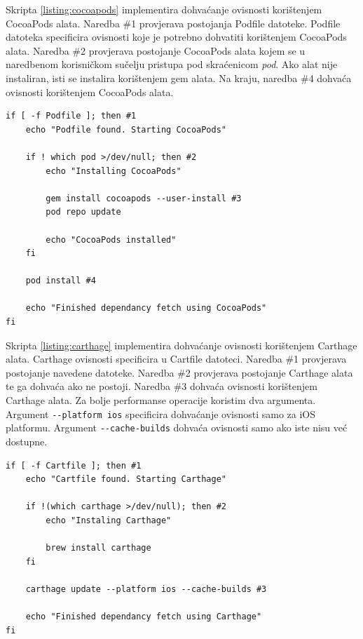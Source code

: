 \documentclass[times, utf8, diplomski, numeric]{fer}
\begin{document}
\begin{appendices}
Skripta \ref{listing:cocoapods} implementira dohvaćanje ovisnosti korištenjem CocoaPods alata. Naredba \#1 provjerava postojanja Podfile datoteke. Podfile datoteka specificira ovisnosti koje je potrebno dohvatiti korištenjem CocoaPods alata. Naredba \#2 provjerava postojanje CocoaPods alata kojem se u naredbenom korisničkom sučelju pristupa pod skraćenicom \textit{pod}. Ako alat nije instaliran, isti se instalira korištenjem gem alata. Na kraju, naredba \#4 dohvaća ovisnosti korištenjem CocoaPods alata.

\begin{lstlisting}[caption=Dohvat ovisnosti korištenjem alata CocoaPods, label=listing:cocoapods]
if [ -f Podfile ]; then #1
    echo "Podfile found. Starting CocoaPods"

    if ! which pod >/dev/null; then #2
        echo "Installing CocoaPods"

        gem install cocoapods --user-install #3
        pod repo update

        echo "CocoaPods installed"
    fi

    pod install #4

    echo "Finished dependancy fetch using CocoaPods"
fi
\end{lstlisting}

Skripta \ref{listing:carthage} implementira dohvaćanje ovisnosti korištenjem Carthage alata. Carthage ovisnosti specificira u Cartfile datoteci. Naredba \#1 provjerava postojanje navedene datoteke. Naredba \#2 provjerava postojanje Carthage alata te ga dohvaća ako ne postoji. Naredba \#3 dohvaća ovisnosti korištenjem Carthage alata. Za bolje performanse operacije koristim dva argumenta. Argument \verb|--platform ios| specificira dohvaćanje ovisnosti samo za iOS platformu. Argument \verb|--cache-builds| dohvaća ovisnosti samo ako iste nisu već dostupne.

\begin{lstlisting}[caption=Dohvat ovisnosti korištenjem alata Carthage, label=listing:carthage]
if [ -f Cartfile ]; then #1
    echo "Cartfile found. Starting Carthage"

    if !(which carthage >/dev/null); then #2
        echo "Instaling Carthage"

        brew install carthage
    fi

    carthage update --platform ios --cache-builds #3

    echo "Finished dependancy fetch using Carthage"
fi
\end{lstlisting}


\end{appendices}
\end{document}
